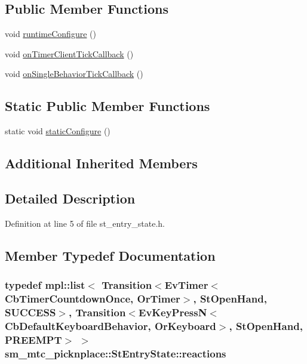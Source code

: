 \subsection*{Public Member Functions}
\begin{DoxyCompactItemize}
\item 
void \hyperlink{structsm__mtc__picknplace_1_1StEntryState_ad6b05fbd60522e8a259a97926914b17d}{runtime\+Configure} ()
\item 
void \hyperlink{structsm__mtc__picknplace_1_1StEntryState_a619f38576fb61d4b05579e91604ba518}{on\+Timer\+Client\+Tick\+Callback} ()
\item 
void \hyperlink{structsm__mtc__picknplace_1_1StEntryState_a2eef86bc1a8542b96c71d3559f579416}{on\+Single\+Behavior\+Tick\+Callback} ()
\end{DoxyCompactItemize}
\subsection*{Static Public Member Functions}
\begin{DoxyCompactItemize}
\item 
static void \hyperlink{structsm__mtc__picknplace_1_1StEntryState_a5da809db2ac82a9727ca89a2f36cbefb}{static\+Configure} ()
\end{DoxyCompactItemize}
\subsection*{Additional Inherited Members}


\subsection{Detailed Description}


Definition at line 5 of file st\+\_\+entry\+\_\+state.\+h.



\subsection{Member Typedef Documentation}
\subsubsection[{\texorpdfstring{reactions}{reactions}}]{\setlength{\rightskip}{0pt plus 5cm}typedef mpl\+::list$<$ Transition$<$Ev\+Timer$<$Cb\+Timer\+Countdown\+Once, {\bf Or\+Timer}$>$, {\bf St\+Open\+Hand}, {\bf S\+U\+C\+C\+E\+SS}$>$, Transition$<$Ev\+Key\+PressN$<$Cb\+Default\+Keyboard\+Behavior, {\bf Or\+Keyboard}$>$, {\bf St\+Open\+Hand}, {\bf P\+R\+E\+E\+M\+PT}$>$ $>$ {\bf sm\+\_\+mtc\+\_\+picknplace\+::\+St\+Entry\+State\+::reactions}}\hypertarget{structsm__mtc__picknplace_1_1StEntryState_ac751a269a130ccadc026892a4e0face5}{}\label{structsm__mtc__picknplace_1_1StEntryState_ac751a269a130ccadc026892a4e0face5}


